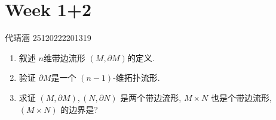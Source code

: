 \documentclass[../main.tex]{subfiles}
\begin{document}
\chapter{ Week 1+2 }


代靖涵 25120222201319


\begin{exercise}{}{}
    \begin{enumerate}
        \item 叙述 \(  n  \)维带边流形 \(  \left( M,  \partial M \right)   \)的定义.
        \item 验证 \(   \partial M  \)是一个 \(  \left( n-1 \right)   \)-维拓扑流形.    
        \item 求证 $(M, \partial M), (N, \partial N)$ 是两个带边流形, $M \times N$ 也是个带边流形, $(M \times N)$ 的边界是?
    \end{enumerate}
    
\end{exercise}
\end{document}
